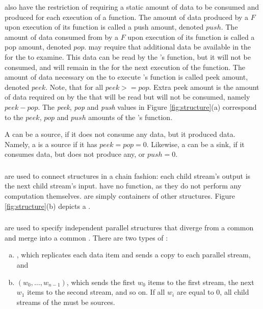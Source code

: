 {\filters} also have the restriction of requiring a static amount
of data to be consumed and produced for each execution of a
{\work} function.  The amount of data produced by a {\filter} $F$
upon execution of its {\work} function is called a push amount,
denoted $push$. The amount of data consumed from {\Input}
{\Channel} by a {\filter} $F$ upon execution of its {\work}
function is called a pop amount, denoted $pop$.  {\filters} may
require that additional data be available in the {\Input}
{\Channel} for the {\filter} to examine.  This data can be read by
the {\filter}'s {\work} function, but it will not be consumed, and
will remain in the {\Channel} for the next execution of the
{\work} function.  The amount of data necessary on the {\Input}
{\Channel} to execute {\filter}'s {\work} function is called peek
amount, denoted $peek$.  Note, that for all {\filters} $peek
>= pop$.  Extra peek amount is the amount of data required on by
the {\filter} that will be read but will not be consumed, namely
$peek - pop$.  The \emph{peek}, \emph{pop} and \emph{push} values
in Figure \ref{fig:structure}(a) correspond to the $peek$, $pop$
and $push$ amounts of the {\filter}'s {\work} function.

A {\filter} can be a source, if it does not consume any data, but
it produced data.  Namely, a {\filter} is a source if it has $peek
= pop = 0$. Likewise, a {\filter} can be a sink, if it consumes
data, but does not produce any, or $push = 0$.

\subsubsection{\pipelines}

{\pipelines} are used to connect {\StreamIt} structures in a chain
fashion: each child stream's output is the next child stream's
input. {\pipelines} have no {\work} function, as they do not perform
any computation themselves. {\pipelines} are simply containers of
other {\StreamIt} structures.  Figure \ref{fig:structure}(b) depicts
a {\pipeline}.

\subsubsection{\splitjoins}

{\splitjoins} are used to specify independent parallel structures
that diverge from a common {\splitter} and merge into a common
{\joiner}.  There are two types of {\splitters}:
\begin{enumerate}[(a)]
\item %
{\duplicate}, which replicates each data item and sends a copy to
each parallel stream, and

\item %
{\roundrobin} $(w_0,\dots, w_{n-1})$, which sends the first $w_0$
items to the first stream, the next $w_1$ items to the second
stream, and so on.  If all $w_i$ are equal to $0$, all child
streams of the {\splitjoin} must be sources.
\end{enumerate}

